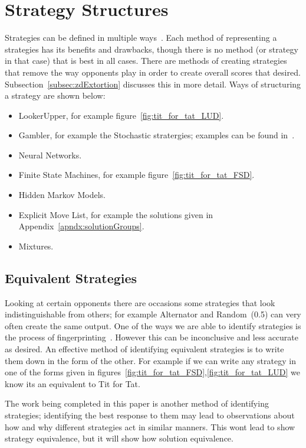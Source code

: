 \section{Strategy Structures}\label{sec:stratergyStructures}
Strategies can be defined in multiple ways~\cite{harper2017reinforcement}.
Each method of representing a strategies has its benefits and drawbacks, though there is no method (or strategy in that case) that is best in all cases.
There are methods of creating strategies that remove the way opponents play in order to create overall scores that desired.
Subsection~\ref{subsec:zdExtortion} discusses this in more detail.
Ways of structuring a strategy are shown below:

\begin{itemize}
 \item LookerUpper, for example figure~\ref{fig:tit_for_tat_LUD}.
 \item Gambler, for example the Stochastic stratergies; examples can be found in~\cite{press2012iterated}.
 \item Neural Networks.
 \item Finite State Machines, for example figure~\ref{fig:tit_for_tat_FSD}.
 \item Hidden Markov Models.
 \item Explicit Move List, for example the solutions given in Appendix~\ref{apndx:solutionGroups}.
 \item Mixtures.
\end{itemize}


\subsection{Equivalent Strategies}\label{subsec:equivalentStrategies}
Looking at certain opponents there are occasions some strategies that look indistinguishable from others;
for example Alternator and Random~(0.5) can very often create the same output.
One of the ways we are able to identify strategies is the process of fingerprinting~\cite{Ashlock2004,Ashlock2008}.
However this can be inconclusive and less accurate as desired.
An effective method of identifying equivalent strategies is to write them down in the form of the other.
For example if we can write any strategy in one of the forms given in figures~\ref{fig:tit_for_tat_FSD},\ref{fig:tit_for_tat_LUD} we know its an equivalent to Tit for Tat.

The work being completed in this paper is another method of identifying strategies; identifying the best response to them may lead to observations about how and why different strategies act in similar manners.
This wont lead to show strategy equivalence, but it will show how solution equivalence.

